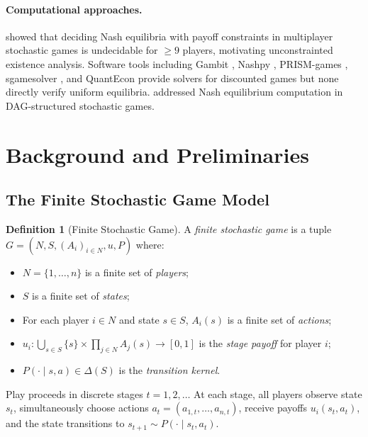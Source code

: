 \documentclass[11pt,a4paper]{article}
\theoremstyle{definition}
\newtheorem{definition}[theorem]{Definition}
\begin{document}
\paragraph{Computational approaches.}
\citet{ummels2011complexity} showed that deciding Nash equilibria with payoff constraints in multiplayer stochastic games is undecidable for $\geq 9$ players, motivating unconstrainted existence analysis.
Software tools including Gambit \citep{gambit2025}, Nashpy \citep{knight2018nashpy}, PRISM-games \citep{kwiatkowska2013prism}, sgamesolver \citep{eibelshaeuser2022sgamesolver}, and QuantEcon \citep{quantecon2024} provide solvers for discounted games but none directly verify uniform equilibria.
\citet{ganzfried2020computing} addressed Nash equilibrium computation in DAG-structured stochastic games.

\section{Background and Preliminaries}\label{sec:background}

\subsection{The Finite Stochastic Game Model}

\begin{definition}[Finite Stochastic Game]\label{def:game}
A \emph{finite stochastic game} is a tuple $G = (N, S, (A_i)_{i \in N}, u, P)$ where:
\begin{itemize}[leftmargin=1.5em]
    \item $N = \{1, \ldots, n\}$ is a finite set of \emph{players};
    \item $S$ is a finite set of \emph{states};
    \item For each player $i \in N$ and state $s \in S$, $A_i(s)$ is a finite set of \emph{actions};
    \item $u_i \colon \bigcup_{s \in S} \{s\} \times \prod_{j \in N} A_j(s) \to [0,1]$ is the \emph{stage payoff} for player $i$;
    \item $P(\cdot \mid s, a) \in \Delta(S)$ is the \emph{transition kernel}.
\end{itemize}
\end{definition}

Play proceeds in discrete stages $t = 1, 2, \ldots$ At each stage, all players observe state $s_t$, simultaneously choose actions $a_t = (a_{1,t}, \ldots, a_{n,t})$, receive payoffs $u_i(s_t, a_t)$, and the state transitions to $s_{t+1} \sim P(\cdot \mid s_t, a_t)$.
\end{document}
